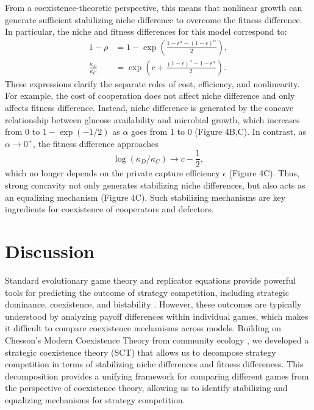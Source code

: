 \documentclass[12pt]{article}
\begin{document}
From a coexistence-theoretic perspective, this means that nonlinear growth can generate sufficient stabilizing niche difference to overcome the fitness difference. 
In particular, the niche and fitness differences for this model correspond to:
\begin{align}
1- \rho &= 1- \exp\left(\frac{1 - \epsilon^\alpha - (1-\epsilon)^\alpha }{2}\right),\\
\frac{\kappa_D}{\kappa_C} &= \exp\left(c + \frac{(1-\epsilon)^\alpha - 1 - \epsilon^{\alpha} }{2} \right).
\end{align}
These expressions clarify the separate roles of cost, efficiency, and nonlinearity.
For example, the cost of cooperation does not affect niche difference and only affects fitness difference.  
Instead, niche difference is generated by the concave relationship between glucose availability and microbial growth, which increases from 0 to $1-\exp(-1/2)$ as $\alpha$ goes from 1 to 0  (Figure 4B,C).
In contrast, as $\alpha \to 0^+$, the fitness difference approaches 
\begin{equation}
\log(\kappa_D/\kappa_C) \to c-\frac{1}{2},
\end{equation}
which no longer depends on the private capture efficiency $\epsilon$ (Figure 4C). 
Thus, strong concavity not only generates stabilizing niche differences, but also acts as an equalizing mechanism (Figure 4C).
Such stabilizing mechanisms are key ingredients for coexistence of cooperators and defectors.

\section*{Discussion}

Standard evolutionary game theory and replicator equations provide powerful tools for predicting the outcome of strategy competition, including strategic dominance, coexistence, and bistability \citep{motro1991co,doebeli2004evolutionary,hauert2004spatial,doebeli2005models,gore2009snowdrift,souza2009evolution,archetti2011coexistence,steidinger2014coexistence,tarnita2025reconciling}.
However, these outcomes are typically understood by analyzing payoff differences within individual games, which makes it difficult to compare coexistence mechanisms across models.
Building on Chesson's Modern Coexistence Theory from community ecology \citep{chesson2000mechanisms}, we developed a strategic coexistence theory (SCT) that allows us to decompose strategy competition in terms of stabilizing niche differences and fitness differences.
This decomposition provides a unifying framework for comparing different games from the perspective of coexistence theory, allowing us to identify stabilizing and equalizing mechanisms for strategy competition.
\end{document}
